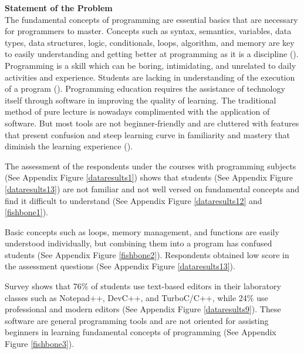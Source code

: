 \flushleft
\textbf{Statement of the Problem}\\

\justifying
\parx
The fundamental concepts of programming are essential basics that are necessary
for programmers to master. Concepts such as syntax, semantics, variables, data
types, data structures, logic, conditionals, loops, algorithm, and memory are
key to easily understanding and getting better at programming as it is a
discipline (\cite{prahofer_hurnaus_wirth_mossenbock_2007}).
Programming is a skill which can be boring, intimidating, and unrelated to daily
activities and experience. Students are lacking in understanding of the
execution of a program (\cite{tan_2019}).
Programming education requires the assistance of technology itself through
software in improving the quality of learning. The traditional method of pure
lecture is nowadays complimented with the application of software. But most
tools are not beginner-friendly and are cluttered with features that present
confusion and steep learning curve in familiarity and mastery that diminish the
learning experience (\cite{tsukamoto_2016}).

\justifying
\parx
The assessment of the respondents under the courses with programming subjects
(See Appendix Figure \ref{dataresults1}) shows that students (See Appendix
Figure \ref{dataresults13})
are not familiar and not well versed on fundamental concepts and find it
difficult to understand
(See Appendix Figure \ref{dataresults12} and \ref{fishbone1}).

\parx
Basic concepts such as loops, memory management, and functions are easily
understood individually, but combining them into a program has confused
students (See Appendix Figure \ref{fishbone2}). Respondents obtained low score
in the assessment questions (See Appendix Figure \ref{dataresults13}).

\parx
Survey shows that 76\% of students use text-based editors in their laboratory
classes such as Notepad++, DevC++, and TurboC/C++, while 24\% use professional
and modern editors (See Appendix Figure \ref{dataresults9}). These software are
general programming tools and are not oriented for assisting beginners in
learning fundamental concepts of programming (See Appendix Figure
\ref{fishbone3}).
